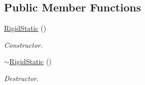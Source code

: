 \subsection*{Public Member Functions}
\begin{DoxyCompactItemize}
\item 
\hypertarget{classContent_1_1Actor_1_1Physics_1_1RigidStatic_a023aa76fcf3a93bb7b03de042161513d}{
\hyperlink{classContent_1_1Actor_1_1Physics_1_1RigidStatic_a023aa76fcf3a93bb7b03de042161513d}{RigidStatic} ()}
\label{classContent_1_1Actor_1_1Physics_1_1RigidStatic_a023aa76fcf3a93bb7b03de042161513d}

\begin{DoxyCompactList}\small\item\em Constructor. \item\end{DoxyCompactList}\item 
\hypertarget{classContent_1_1Actor_1_1Physics_1_1RigidStatic_a8d00caef934332476d9bdf72262e7e74}{
\hyperlink{classContent_1_1Actor_1_1Physics_1_1RigidStatic_a8d00caef934332476d9bdf72262e7e74}{$\sim$RigidStatic} ()}
\label{classContent_1_1Actor_1_1Physics_1_1RigidStatic_a8d00caef934332476d9bdf72262e7e74}

\begin{DoxyCompactList}\small\item\em Destructor. \item\end{DoxyCompactList}\end{DoxyCompactItemize}
